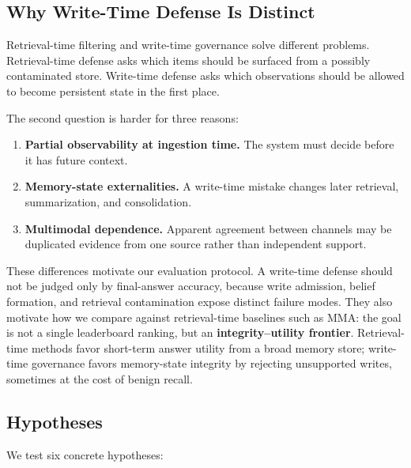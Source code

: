 \documentclass{article}
\begin{document}
\subsection{Why Write-Time Defense Is Distinct}

Retrieval-time filtering and write-time governance solve different problems. Retrieval-time defense asks which items should be surfaced from a possibly contaminated store. Write-time defense asks which observations should be allowed to become persistent state in the first place.

The second question is harder for three reasons:

\begin{enumerate}
\item \textbf{Partial observability at ingestion time.} The system must decide before it has future context.
\item \textbf{Memory-state externalities.} A write-time mistake changes later retrieval, summarization, and consolidation.
\item \textbf{Multimodal dependence.} Apparent agreement between channels may be duplicated evidence from one source rather than independent support.
\end{enumerate}

These differences motivate our evaluation protocol. A write-time defense should not be judged only by final-answer accuracy, because write admission, belief formation, and retrieval contamination expose distinct failure modes. They also motivate how we compare against retrieval-time baselines such as MMA: the goal is not a single leaderboard ranking, but an \textbf{integrity--utility frontier}. Retrieval-time methods favor short-term answer utility from a broad memory store; write-time governance favors memory-state integrity by rejecting unsupported writes, sometimes at the cost of benign recall.

\subsection{Hypotheses}

We test six concrete hypotheses:
\end{document}
